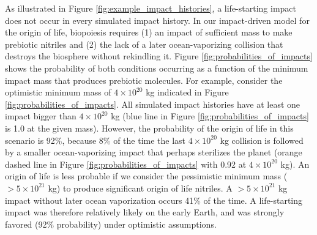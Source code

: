 \documentclass[manuscript]{aastex63}
\begin{document}
As illustrated in Figure \ref{fig:example_impact_histories}, a life-starting impact does not occur in every simulated impact history. In our impact-driven model for the origin of life, biopoiesis requires (1) an impact of sufficient mass to make prebiotic nitriles and (2) the lack of a later ocean-vaporizing collision that destroys the biosphere without rekindling it. Figure \ref{fig:probabilities_of_impacts} shows the probability of both conditions occurring as a function of the minimum impact mass that produces prebiotic molecules. For example, consider the \citet{Wogan_2023} optimistic minimum mass of $4 \times 10^{20}$ kg indicated in Figure \ref{fig:probabilities_of_impacts}. All simulated impact histories have at least one impact bigger than $4 \times 10^{20}$ kg (blue line in Figure \ref{fig:probabilities_of_impacts} is 1.0 at the given mass). However, the probability of the origin of life in this scenario is 92\%, because 8\% of the time the last $4 \times 10^{20}$ kg collision is followed by a smaller ocean-vaporizing impact that perhaps sterilizes the planet (orange dashed line in Figure \ref{fig:probabilities_of_impacts} with 0.92 at $4 \times 10^{20}$ kg). An origin of life is less probable if we consider the \citet{Wogan_2023} pessimistic minimum mass ($> 5 \times 10^{21}$ kg) to produce significant origin of life nitriles. A $> 5 \times 10^{21}$ kg impact without later ocean vaporization occurs 41\% of the time. A life-starting impact was therefore relatively likely on the early Earth, and was strongly favored (92\% probability) under optimistic assumptions.
\end{document}
